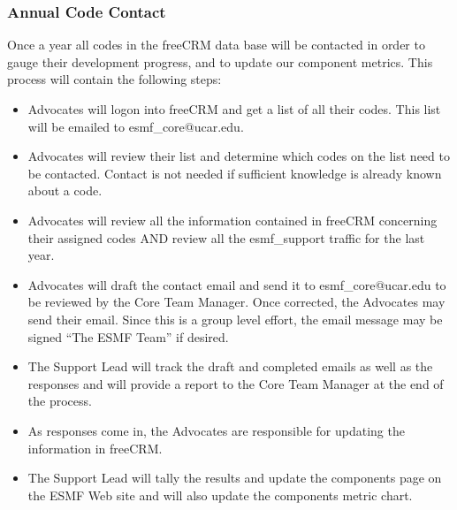 \subsubsection{Annual Code Contact}
Once a year all codes in the freeCRM data base will be contacted in order to gauge 
their development progress, and to update our component metrics. This process will 
contain the following steps:
\begin{itemize}
\item Advocates will logon into freeCRM and get a list of all their codes. 
This list will be emailed to esmf\_core@ucar.edu.
\item Advocates will review their list and determine which codes on the list need to be
contacted. Contact is not needed if sufficient knowledge is already known about a 
code.
\item Advocates will review all the information contained in freeCRM concerning their 
assigned codes AND review all the esmf\_support traffic for the last year.  
\item Advocates will draft the contact email and send it to esmf\_core@ucar.edu to be 
reviewed by the Core Team Manager.  Once corrected, the Advocates may send their email. Since 
this is a group level effort, the email message may be signed ``The ESMF Team'' if 
desired. 
\item The Support Lead will track the draft and completed emails as well as the 
responses and will provide a report to the Core Team Manager at the end of the 
process.  
\item As responses come in, the Advocates are responsible for updating the 
information in freeCRM.  
\item The Support Lead will tally the results and update the components page on the
ESMF Web site and will also update the components metric chart.  
\end{itemize}



 
